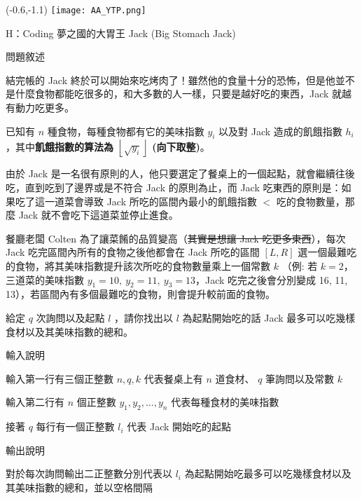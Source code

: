 \documentclass[12pt]{article}
\newcommand{\ProblemTitleFont}{\ProblemTitleMainFont\ProblemTitleCJKFont}
\newcommand{\ProblemTitle}[2]{\noindent\Large{\ProblemTitleFont #1 (#2)}\normalsize\par}
\newcommand{\ProblemSection}[1]{\vspace{0.6cm}\par\noindent\large{\ProblemTitleFont #1}\normalsize\par}
\newcommand{\ProblemStatement}{\ProblemSection{問題敘述}}
\newcommand{\ProblemInput}{\ProblemSection{輸入說明}}
\newcommand{\ProblemOutput}{\ProblemSection{輸出說明}}
\begin{document}
\begin{textblock}{0.1}(-0.6,-1.1)
	\texttt{[image: AA\_YTP.png]}
\end{textblock}


\renewcommand{\headrulewidth}{0pt}
\renewcommand{\baselinestretch}{1.3}
\setlength\parindent{24pt}
\setlength\parskip{12pt}
\cfoot{\thepage}

\ProblemTitle{H：Coding 夢之國的大胃王 Jack}{Big Stomach Jack}

\ProblemStatement

結完帳的 Jack 終於可以開始來吃烤肉了！雖然他的食量十分的恐怖，但是他並不是什麼食物都能吃很多的，和大多數的人一樣，只要是越好吃的東西，Jack 就越有動力吃更多。

已知有 $n$ 種食物，每種食物都有它的美味指數 $y_i$ 以及對 Jack 造成的飢餓指數 $h_i$，其中\textbf{飢餓指數的算法為 $\left \lfloor \sqrt{y_i} \right \rfloor$ (向下取整)}。

由於 Jack 是一名很有原則的人，他只要選定了餐桌上的一個起點，就會繼續往後吃，直到吃到了邊界或是不符合 Jack 的原則為止，而 Jack 吃東西的原則是：如果吃了這一道菜會導致 Jack 所吃的區間內最小的飢餓指數 $<$ 吃的食物數量，那麼 Jack 就不會吃下這道菜並停止進食。

餐廳老闆 Colten 為了讓菜餚的品質變高（\sout{其實是想讓 Jack 吃更多東西}），每次 Jack 吃完區間內所有的食物之後他都會在 Jack 所吃的區間 $[L,R]$ 選一個最難吃的食物，將其美味指數提升該次所吃的食物數量乘上一個常數 $k$ （例: 若 $k=2$，三道菜的美味指數 $y_1=10,\ y_2=11,\ y_3=13$，Jack 吃完之後會分別變成 16, 11, 13），若區間內有多個最難吃的食物，則會提升較前面的食物。

給定 $q$ 次詢問以及起點 $l$ ，請你找出以 $l$ 為起點開始吃的話 Jack 最多可以吃幾樣食材以及其美味指數的總和。



\ProblemInput

輸入第一行有三個正整數 $n,q,k$ 代表餐桌上有 $n$ 道食材、 $q$ 筆詢問以及常數 $k$

輸入第二行有 $n$ 個正整數 $y_1,y_2,...,y_n$ 代表每種食材的美味指數 

接著 $q$ 每行有一個正整數 $l_i$ 代表 Jack 開始吃的起點

\clearpage

\ProblemOutput

對於每次詢問輸出二正整數分別代表以 $l_i$ 為起點開始吃最多可以吃幾樣食材以及其美味指數的總和，並以空格間隔
\end{document}
